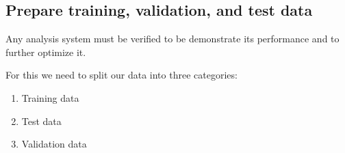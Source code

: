 \documentclass[letterpaper,10pt,english]{sphinxmanual}
\begin{document}
\noindent{}


\subsection{Prepare training, validation, and test data}
\label{\detokenize{ML4NeutronImageSegmentation:prepare-training-validation-and-test-data}}
Any analysis system must be verified to be demonstrate its performance and to further optimize it.

For this we need to split our data into three categories:
\begin{enumerate}
%
\item {} 
Training data

\item {} 
Test data

\item {} 
Validation data

\end{enumerate}
\end{document}
